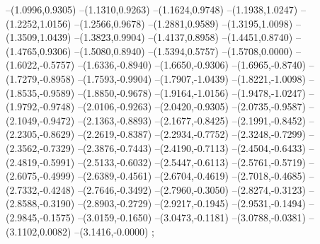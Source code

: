 {--(1.0996,0.9305)
--(1.1310,0.9263)
--(1.1624,0.9748)
--(1.1938,1.0247)
--(1.2252,1.0156)
--(1.2566,0.9678)
--(1.2881,0.9589)
--(1.3195,1.0098)
--(1.3509,1.0439)
--(1.3823,0.9904)
--(1.4137,0.8958)
--(1.4451,0.8740)
--(1.4765,0.9306)
--(1.5080,0.8940)
--(1.5394,0.5757)
--(1.5708,0.0000)
--(1.6022,-0.5757)
--(1.6336,-0.8940)
--(1.6650,-0.9306)
--(1.6965,-0.8740)
--(1.7279,-0.8958)
--(1.7593,-0.9904)
--(1.7907,-1.0439)
--(1.8221,-1.0098)
--(1.8535,-0.9589)
--(1.8850,-0.9678)
--(1.9164,-1.0156)
--(1.9478,-1.0247)
--(1.9792,-0.9748)
--(2.0106,-0.9263)
--(2.0420,-0.9305)
--(2.0735,-0.9587)
--(2.1049,-0.9472)
--(2.1363,-0.8893)
--(2.1677,-0.8425)
--(2.1991,-0.8452)
--(2.2305,-0.8629)
--(2.2619,-0.8387)
--(2.2934,-0.7752)
--(2.3248,-0.7299)
--(2.3562,-0.7329)
--(2.3876,-0.7443)
--(2.4190,-0.7113)
--(2.4504,-0.6433)
--(2.4819,-0.5991)
--(2.5133,-0.6032)
--(2.5447,-0.6113)
--(2.5761,-0.5719)
--(2.6075,-0.4999)
--(2.6389,-0.4561)
--(2.6704,-0.4619)
--(2.7018,-0.4685)
--(2.7332,-0.4248)
--(2.7646,-0.3492)
--(2.7960,-0.3050)
--(2.8274,-0.3123)
--(2.8588,-0.3190)
--(2.8903,-0.2729)
--(2.9217,-0.1945)
--(2.9531,-0.1494)
--(2.9845,-0.1575)
--(3.0159,-0.1650)
--(3.0473,-0.1181)
--(3.0788,-0.0381)
--(3.1102,0.0082)
--(3.1416,-0.0000)
;}

